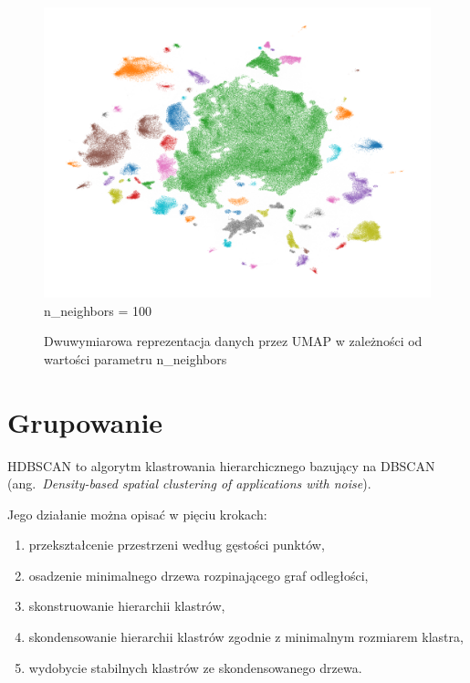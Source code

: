 \begin{figure}[htb]
\begin{minipage}{.33\textwidth}
			\includegraphics[width=\linewidth]{rys04/umap_100_100_100.png}
			n\_neighbors = 100
		\end{minipage}
		\caption{Dwuwymiarowa reprezentacja danych przez UMAP w zależności od wartości parametru n\_neighbors}\label{fig:umap}
	\end{figure}
	

\section{Grupowanie}
	HDBSCAN to algorytm klastrowania hierarchicznego bazujący na DBSCAN (ang.\ \emph{Density-based spatial clustering of applications with noise}).
	
	Jego działanie można opisać w pięciu krokach:
	\begin{enumerate}
		\item przekształcenie przestrzeni według gęstości punktów,
		\item osadzenie minimalnego drzewa rozpinającego graf odległości,
		\item skonstruowanie hierarchii klastrów,
		\item skondensowanie hierarchii klastrów zgodnie z minimalnym rozmiarem klastra,
		\item wydobycie stabilnych klastrów ze skondensowanego drzewa.
	\end{enumerate}
	
